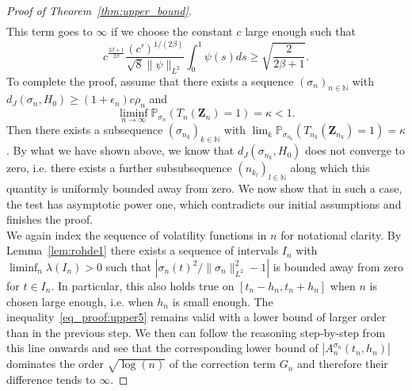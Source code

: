 \documentclass[10.5pt,letter]{article}
\numberwithin{equation}{section}
\theoremstyle{definition}
\newcommand{\N}{\mathbb{N}}
\renewcommand{\P}{\mathbb{P}}
\newcommand{\1}{\mathbbm{1}}
\begin{document}
\begin{proof}[Proof of Theorem~\ref{thm:upper_bound}]
\begin{align*}
\end{align*}
This term goes to $\infty$ if we choose the constant $c$ large enough such that
\[ c^{\frac{2\beta+1}{2\beta}} \frac{(c')^{1/(2\beta)}}{\sqrt{8}\|\psi\|_{L^2}}\int_0^1\psi(s)ds \geq \sqrt{\frac{2}{2\beta+1}}.\]
To complete the proof, assume that there exists a sequence $(\sigma_n)_{n\in\N}$ with $d_J(\sigma_n,H_0) \geq (1+\epsilon_n)c\rho_n$ and
\[ \liminf_{n\to\infty} \P_{\sigma_n}\left( T_n(\mathbf{Z}_n) =1\right) = \kappa <1.\]
Then there exists a subsequence $(\sigma_{n_k})_{k\in\N}$ with $\lim_k\P_{\sigma_{n_k}}(T_{n_k}(\mathbf{Z}_{n_k}) =1) =\kappa$. By what we have shown above, we know that $d_J(\sigma_{n_k},H_0)$ does not converge to zero, i.e. there exists a further subsubsequence $(n_{k_l})_{l\in\N}$ along which this quantity is uniformly bounded away from zero. We now show that in such a case, the test has asymptotic power one, which contradicts our initial assumptions and finishes the proof.\\
We again index the sequence of volatility functions in $n$ for notational clarity. By Lemma~\ref{lem:rohde1} there exists a sequence of intervals $I_n$ with $\liminf_n \lambda(I_n)>0$ such that $|\sigma_n(t)^2/\|\sigma_n\|_{L^2}^2-1|$ is bounded away from zero for $t\in I_n$. In particular, this also holds true on $[t_n-h_n, t_n+h_n]$ when $n$ is chosen large enough, i.e. when $h_n$ is small enough. The inequality~\eqref{eq_proof:upper5} remains valid with a lower bound of larger order than in the previous step. We then can follow the reasoning step-by-step from this line onwards and see that the corresponding lower bound of $|A_n^{\sigma_n}(t_n,h_n)|$ dominates the order $\sqrt{\log(n)}$ of the correction term $G_n$ and therefore their difference tends to $\infty$.



\end{proof}
\end{document}
